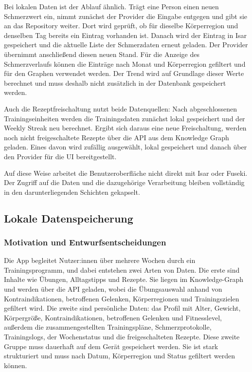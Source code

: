 Bei lokalen Daten ist der Ablauf ähnlich. Trägt eine Person einen neuen Schmerzwert ein, nimmt zunächst der Provider die Eingabe entgegen und gibt sie an das Repository weiter. Dort wird geprüft, ob für dieselbe Körperregion und denselben Tag bereits ein Eintrag vorhanden ist. Danach wird der Eintrag in Isar gespeichert und die aktuelle Liste der Schmerzdaten erneut geladen. Der Provider übernimmt anschließend diesen neuen Stand. Für die Anzeige des Schmerzverlaufs können die Einträge nach Monat und Körperregion gefiltert und für den Graphen verwendet werden. Der Trend wird auf Grundlage dieser Werte berechnet und muss deshalb nicht zusätzlich in der Datenbank gespeichert werden.

Auch die Rezeptfreischaltung nutzt beide Datenquellen: Nach abgeschlossenen Trainingseinheiten werden die Trainingsdaten zunächst lokal gespeichert und der Weekly Streak neu berechnet. Ergibt sich daraus eine neue Freischaltung, werden noch nicht freigeschaltete Rezepte über die API aus dem Knowledge Graph geladen. Eines davon wird zufällig ausgewählt, lokal gespeichert und danach über den Provider für die UI bereitgestellt.

Auf diese Weise arbeitet die Benutzeroberfläche nicht direkt mit Isar oder Fuseki. Der Zugriff auf die Daten und die dazugehörige Verarbeitung bleiben vollständig in den darunterliegenden Schichten gekapselt.


\subsection{Lokale Datenspeicherung}
\subsubsection{Motivation und Entwurfsentscheidungen}
\label{sec:api-isar-motivation}

Die App begleitet Nutzer:innen über mehrere Wochen durch ein Trainingsprogramm, und dabei entstehen zwei Arten von Daten. Die erste sind Inhalte wie Übungen, Alltagstipps und Rezepte. Sie liegen im Knowledge-Graph und werden über die API geladen, wobei die Übungsauswahl anhand von Kontraindikationen, betroffenen Gelenken, Körperregionen und Trainingszielen gefiltert wird. Die zweite sind persönliche Daten: das Profil mit Alter, Gewicht, Körpergröße, Kontraindikationen, betroffenen Gelenken und Fitnesslevel, außerdem die zusammengestellten Trainingspläne, Schmerzprotokolle, Trainingslogs, der Wochenstatus und die freigeschalteten Rezepte. Diese zweite Gruppe muss dauerhaft auf dem Gerät gespeichert werden. Sie ist stark strukturiert und muss nach Datum, Körperregion und Status gefiltert werden können.

